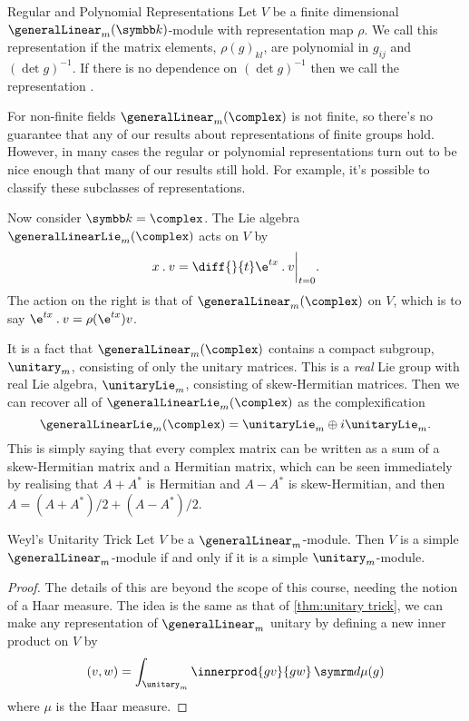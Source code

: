 \begin{dfn}{Regular and Polynomial Representations}{}
    Let \(V\) be a finite dimensional \(\generalLinear_m(\field)\)-module with representation map \(\rho\).
    We call this representation  if the matrix elements, \(\rho(g)_{kl}\), are polynomial in \(g_{ij}\) and \((\det g)^{-1}\).
    If there is no dependence on \((\det g)^{-1}\) then we call the representation .
\end{dfn}

For non-finite fields \(\generalLinear_m(\complex)\) is not finite, so there's no guarantee that any of our results about representations of finite groups hold.
However, in many cases the regular or polynomial representations turn out to be nice enough that many of our results still hold.
For example, it's possible to classify these subclasses of representations.

Now consider \(\field = \complex\).
The Lie algebra \(\generalLinearLie_m(\complex)\) acts on \(V\) by
\begin{equation}
    x \action v = \diff{}{t} \e^{tx} \action v \bigg|_{t = 0}.
\end{equation}
The action on the right is that of \(\generalLinear_m(\complex)\) on \(V\), which is to say \(\e^{tx} \action v = \rho(\e^{tx})v\).

It is a fact that \(\generalLinear_m(\complex)\) contains a compact subgroup, \(\unitary_m\), consisting of only the unitary matrices.
This is a \emph{real} Lie group with real Lie algebra, \(\unitaryLie_m\), consisting of skew-Hermitian matrices.
Then we can recover all of \(\generalLinearLie_m(\complex)\) as the complexification
\begin{equation}
    \generalLinearLie_m(\complex) = \unitaryLie_m \oplus i \unitaryLie_m.
\end{equation}
This is simply saying that every complex matrix can be written as a sum of a skew-Hermitian matrix and a Hermitian matrix, which can be seen immediately by realising that \(A + A^*\) is Hermitian and \(A - A^*\) is skew-Hermitian, and then \(A = (A + A^*)/2 + (A - A^*)/2\).

\begin{prp}{Weyl's Unitarity Trick}{}
    Let \(V\) be a \(\generalLinear_m\)-module.
    Then \(V\) is a simple \(\generalLinear_m\)-module if and only if it is a simple \(\unitary_m\)-module.
    \begin{proof}
        The details of this are beyond the scope of this course, needing the notion of a Haar measure.
        The idea is the same as that of \cref{thm:unitary trick}, we can make any representation of \(\generalLinear_m\) unitary by defining a new inner product on \(V\) by
        \begin{equation}
            (v, w) = \int_{\unitary_m} \innerprod{gv}{gw} \dd{\mu(g)}
        \end{equation}
        where \(\mu\) is the Haar measure.
    \end{proof}
\end{prp}

